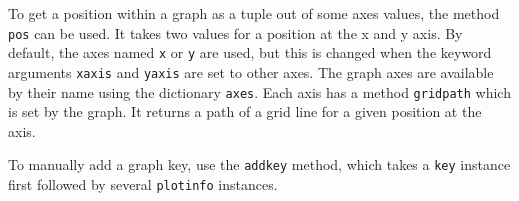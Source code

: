 To get a position within a graph as a tuple out of some axes values,
the method \verb|pos| can be used. It takes two values for a position
at the x and y axis. By default, the axes named \verb|x| or \verb|y|
are used, but this is changed when the keyword arguments \verb|xaxis|
and \verb|yaxis| are set to other axes. The graph axes are available
by their name using the dictionary \verb|axes|. Each axis has a method
\verb|gridpath| which is set by the graph. It returns a path of a grid
line for a given position at the axis.

To manually add a graph key, use the \verb|addkey| method, which takes
a \verb|key| instance first followed by several \verb|plotinfo|
instances.

